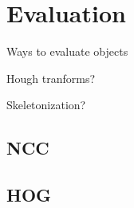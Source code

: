 \section{Evaluation}

Ways to evaluate objects

Hough tranforms?

Skeletonization?

\subsection{NCC}

\subsection{HOG}
